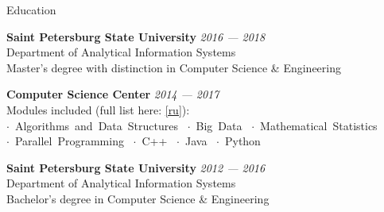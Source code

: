 \documentclass{resume} %
\begin{document}

\begin{rSection}{Education}


{\bf Saint Petersburg State University} \hfill {{\em 2016 --- 2018} \\ 
Department of Analytical Information Systems \\
Master's degree with distinction in Computer Science \& Engineering
}

{\bf Computer Science Center} \hfill {{\em 2014 --- 2017} \\ 
Modules included (full list here:  \href{https://compscicenter.ru/users/734/}{[ru]}): \\
$\cdot$~Algorithms~and~Data~Structures~\hspace{1cm} 
$\cdot$~Big~Data~\hspace{1cm} 
$\cdot$~Mathematical~Statistics~\hspace{1cm}\\
$\cdot$~Parallel~Programming~\hspace{1cm}
$\cdot$~C++~\hspace{1cm} 
$\cdot$~Java~\hspace{1cm} 
$\cdot$~Python~\hspace{1cm}
}

{\bf Saint Petersburg State University} \hfill {{\em 2012 --- 2016} \\ 
Department of Analytical Information Systems \\
Bachelor's degree in Computer Science \& Engineering 
}



\end{rSection}

\end{document}
